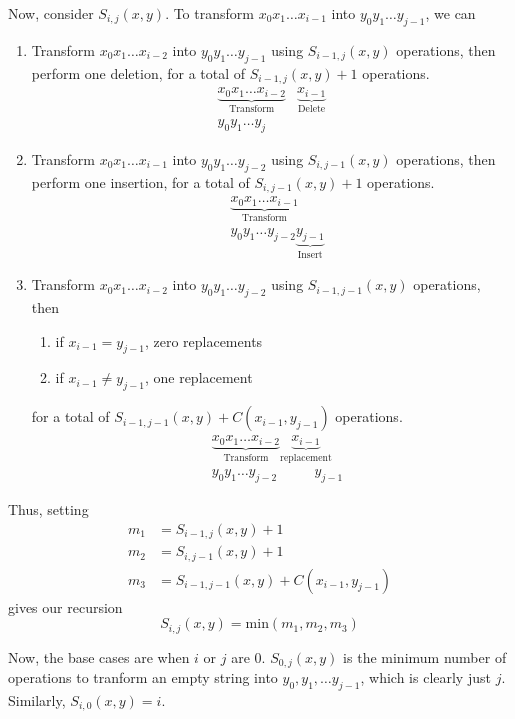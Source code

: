 \begin{solution}
    Now, consider $S_{i, j}(x, y)$. To transform $x_0x_1\hdots x_{i-1}$ into $y_0y_1\hdots y_{j-1}$, we can
    \begin{enumerate}[label=\arabic*.]
        \item Transform $x_0x_1\hdots x_{i-2}$ into $y_0y_1\hdots y_{j-1}$ using $S_{i-1, j}(x, y)$ operations, then perform one deletion, for a total of $S_{i-1, j}(x, y) + 1$ operations.
              \begin{align*}
                  \underbrace{x_0x_1\hdots x_{i-2}}_{\text{Transform}} & \underbrace{x_{i-1}}_{\text{Delete}} \\
                  y_0y_1\hdots y_j                                     &
              \end{align*}
        \item Transform $x_0x_1\hdots x_{i-1}$ into $y_0y_1\hdots y_{j-2}$ using $S_{i, j-1}(x, y)$ operations, then perform one insertion, for a total of $S_{i, j-1}(x, y) + 1$ operations.
              \begin{align*}
                   & \underbrace{x_0x_1\hdots x_{i-1}}_{\text{Transform}}     \\
                   & y_0y_1\hdots y_{j-2}\underbrace{y_{j-1}}_{\text{Insert}}
              \end{align*}
        \item Transform $x_0x_1\hdots x_{i-2}$ into $y_0y_1\hdots y_{j-2}$ using $S_{i-1, j-1}(x, y)$ operations, then
              \begin{enumerate}
                  \item if $x_{i-1}=y_{j-1}$, zero replacements
                  \item if $x_{i-1}\neq y_{j-1}$, one replacement
              \end{enumerate} for a total of $S_{i-1, j-1}(x, y)+C(x_{i-1}, y_{j-1})$ operations.
              \begin{align*}
                   & \underbrace{x_0x_1\hdots x_{i-2}}_{\text{Transform}}\underbrace{x_{i-1}}_{\text{replacement}} \\
                   & y_0y_1\hdots y_{j-2}\text{ }\text{ }\text{ }\text{ }y_{j-1}\end{align*}
    \end{enumerate}
    Thus, setting \begin{align*}m_1&=S_{i-1, j}(x, y) + 1\\m_2&=S_{i, j-1}(x, y) + 1\\m_3&=S_{i-1, j-1}(x, y)+C(x_{i-1}, y_{j-1})\end{align*} gives our recursion \[S_{i,j}(x, y)=\text{min}(m_1, m_2, m_3)\]

    Now, the base cases are when $i$ or $j$ are 0. $S_{0, j}(x,y)$ is the minimum number of operations to tranform an empty string into $y_0, y_1,\hdots y_{j-1}$, which is clearly just $j$. Similarly, $S_{i, 0}(x,y)=i$.
\end{solution}

